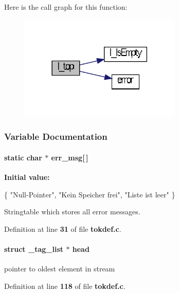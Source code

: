 \-Here is the call graph for this function\-:\nopagebreak
\begin{figure}[H]
\begin{center}
\leavevmode
\includegraphics[width=218pt]{tokdef_8c_a662de1b392ef548996d646fdac76fdf4_cgraph}
\end{center}
\end{figure}




\subsubsection{\-Variable \-Documentation}
\paragraph[{err\-\_\-msg}]{\setlength{\rightskip}{0pt plus 5cm}static char $\ast$ {\bf err\-\_\-msg}[$\,$]\hspace{0.3cm}{\ttfamily  [static]}}\label{tokdef_8c_a404a364e08451a6c51c14b31e237453c}
{\bfseries \-Initial value\-:}
\begin{DoxyCode}
 \{
    \textcolor{stringliteral}{"Null-Pointer"}, \textcolor{stringliteral}{"Kein Speicher frei"},
    \textcolor{stringliteral}{"Liste ist leer"}
  \}
\end{DoxyCode}


\-Stringtable which stores all error messages. 



\-Definition at line {\bf 31} of file {\bf tokdef.\-c}.

\paragraph[{head}]{\setlength{\rightskip}{0pt plus 5cm}struct {\bf \-\_\-tag\-\_\-list} $\ast$ {\bf head}}\label{tokdef_8c_ac89b2e52a88dfd9ed05bbacf90176fcd}


pointer to oldest element in stream 



\-Definition at line {\bf 118} of file {\bf tokdef.\-c}.

